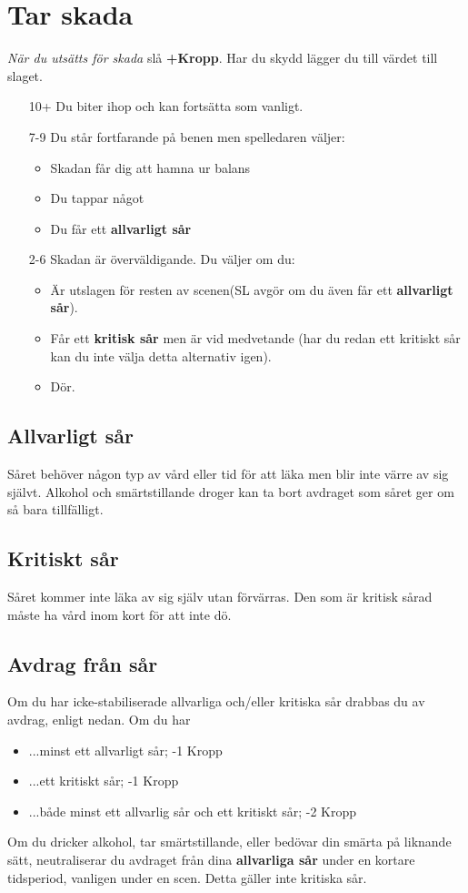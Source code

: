\section{Tar skada}
\textit{När du utsätts för skada} slå \textbf{+Kropp}. Har du skydd lägger du till värdet till slaget.
\begin{itemize}
  \item[10+] Du biter ihop och kan fortsätta som vanligt.
  \item[7-9] Du står fortfarande på benen men spelledaren väljer:
  \begin{itemize}
    \item Skadan får dig att hamna ur balans
    \item Du tappar något
    \item Du får ett \textbf{allvarligt sår}
  \end{itemize}
  \item[2-6] Skadan är överväldigande. Du väljer om du:
  \begin{itemize}
    \item Är utslagen för resten av scenen(SL avgör om du även får ett \textbf{allvarligt sår}).
    \item Får ett \textbf{kritisk sår} men är vid medvetande (har du redan ett kritiskt sår kan du inte välja detta alternativ igen).
    \item Dör.
  \end{itemize}
\end{itemize}
\subsection{Allvarligt sår}
Såret behöver någon typ av vård eller tid för att läka men blir inte värre av sig självt. Alkohol och smärtstillande droger kan ta bort avdraget som såret ger om så bara tillfälligt.
\subsection{Kritiskt sår}
Såret kommer inte läka av sig själv utan förvärras. Den som är kritisk sårad måste ha vård inom kort för att inte dö.
\subsection{Avdrag från sår}
Om du har icke-stabiliserade allvarliga och/eller kritiska sår drabbas du av avdrag, enligt nedan.
Om du har
\begin{itemize}
  \item ...minst ett allvarligt sår; -1 Kropp
  \item ...ett kritiskt sår; -1 Kropp
  \item ...både minst ett allvarlig sår och ett kritiskt sår; -2 Kropp
\end{itemize}
Om du dricker alkohol, tar smärtstillande, eller bedövar din smärta på liknande sätt, neutraliserar du avdraget från dina \textbf{allvarliga sår} under en kortare tidsperiod, vanligen under en scen. Detta gäller inte kritiska sår.
\clearpage
